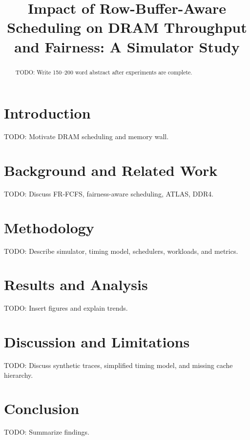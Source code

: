 \documentclass[conference]{IEEEtran}
\begin{document}
\title{Impact of Row-Buffer-Aware Scheduling on DRAM Throughput and Fairness: A Simulator Study}

\author{
}

\maketitle

\begin{abstract}
TODO: Write 150--200 word abstract after experiments are complete.
\end{abstract}

\section{Introduction}
TODO: Motivate DRAM scheduling and memory wall.

\section{Background and Related Work}
TODO: Discuss FR-FCFS, fairness-aware scheduling, ATLAS, DDR4.

\section{Methodology}
TODO: Describe simulator, timing model, schedulers, workloads, and metrics.

\section{Results and Analysis}
TODO: Insert figures and explain trends.

\section{Discussion and Limitations}
TODO: Discuss synthetic traces, simplified timing model, and missing cache hierarchy.

\section{Conclusion}
TODO: Summarize findings.



\end{document}
